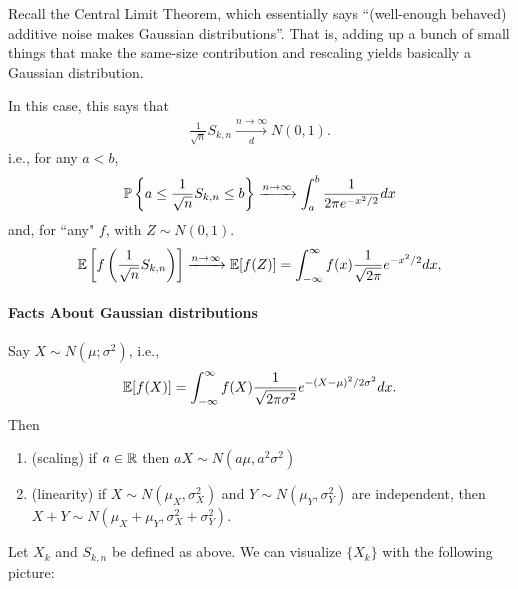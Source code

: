 \documentclass[../../../Master/AppliedStochastics.tex]{subfiles}
\begin{document}
Recall the Central Limit Theorem, which essentially says 
``(well-enough behaved) additive noise makes Gaussian distributions''.  
That is, adding up a bunch of small things that make the same-size contribution and rescaling yields basically a Gaussian distribution.

In this case, this says that 
$$\begin{aligned}
    \frac{1}{\sqrt{n}}S_{k,n}\xrightarrow[d]{n\to\infty} N(0,1).
\end{aligned}$$
i.e., for any $a<b$, 
$$\begin{aligned}
    \P\left\{a\leq\frac{1}{\sqrt{n}}S_{k,n}\leq b\right\}\xrightarrow{n\to\infty}\int_a^b \frac{1}{2\pi e^{-x^2/2}}dx
\end{aligned}$$
and, for ``any" $f$, 
with $Z\sim N(0,1)$.
$$\begin{aligned}
    \E\left[f\left(\frac{1}{\sqrt{n}}S_{k,n}\right)\right]\xrightarrow{n\to\infty}\E[f(Z)]=\int_{-\infty}^\infty f(x)\frac{1}{\sqrt{2\pi}}e^{-x^2/2}dx,
\end{aligned}$$ 

\paragraph{Facts About Gaussian distributions}
Say $X\sim N(\mu;\sigma^2)$, i.e., 
$$\begin{aligned}
    \E[f(X)]=\int_{-\infty}^\infty f(X)\frac{1}{\sqrt{2\pi\sigma^2}}e^{-(X-\mu)^2/2\sigma^2}dx.
\end{aligned}$$  
Then 
\begin{enumerate}
    \item (scaling) if $a\in\R$ then $aX\sim N(a\mu,a^2\sigma^2)$
    \item (linearity) if $X\sim N(\mu_X,\sigma_X^2)$ and $Y\sim N(\mu_Y,\sigma_Y^2)$ are independent, then $X+Y\sim N(\mu_X+\mu_Y,\sigma_X^2+\sigma_Y^2)$.
\end{enumerate}

Let $X_k$ and $S_{k,n}$ be defined as above.  
We can visualize $\{X_k\}$ with the following picture:

\begin{center}
\end{center}
\end{document}

